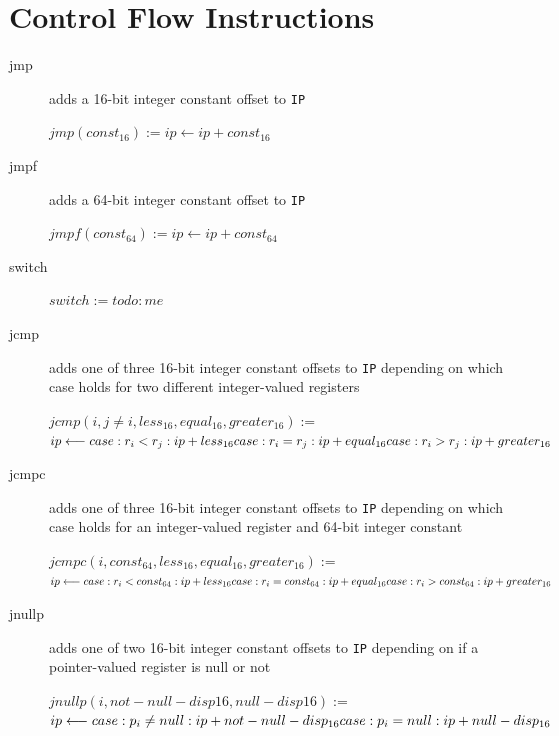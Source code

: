 \documentclass[english,a4paper,12pt]{report}
\begin{document}
\section{Control Flow Instructions}
\begin{description}
	\item[jmp] adds a 16-bit integer constant offset to \verb|IP|
	
	$jmp(const_{16}) := ip \longleftarrow ip + const_{16}$ \\
	\item[jmpf] adds a 64-bit integer constant offset to \verb|IP|
	
	$jmpf(const_{64}) := ip \longleftarrow ip + const_{64}$ \\
	\item[switch]
	
	$switch := todo: me$ \\
	\item[jcmp] adds one of three 16-bit integer constant offsets to
	\verb|IP| depending on which case holds for two different
	integer-valued registers
	
	$jcmp(i, j\neq i,less_{16},equal_{16},greater_{16}) :=$ \\
	$ ip \longleftarrow  \\
	case :r_{i} < r_{j}: ip + less_{16}   \\
	case :r_{i} = r_{j}: ip + equal_{16} \\
	case :r_{i} > r_{j}: ip + greater_{16}$ \\
	\item[jcmpc] adds one of three 16-bit integer constant offsets to
	\verb|IP| depending on which case holds for an integer-valued
	register and 64-bit integer constant
	
	$jcmpc (i, const_{64},less_{16},equal_{16},greater_{16}) :=$ \\
	$ ip \longleftarrow  \\
	case: r_{i} < const_{64}: ip + less_{16}   \\
	case: r_{i} = const_{64}: ip + equal_{16} \\
	case: r_{i} > const_{64}: ip + greater_{16}$
	\item[jnullp] adds one of two 16-bit integer constant offsets to
	\verb|IP| depending on if a pointer-valued register is null or not
	
	$jnullp(i,not-null-disp16,null-disp16) :=$ \\
	$ip \longleftarrow \\
	case: p_{i} \neq null: ip + not-null-disp_{16} \\
	case: p_{i} = null: ip + null-disp_{16}$ \\
\end{description}
\end{document}
